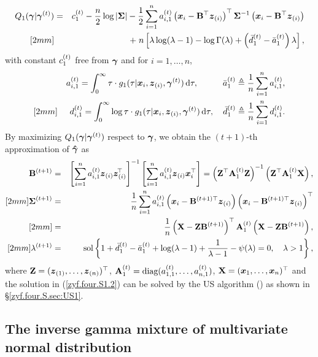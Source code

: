\begin{eqnarray*}
    Q_1({\boldsymbol{\gamma}} | {\boldsymbol{\gamma}}^{(t)}) &=& c^{(t)}_{1} - \frac{n}{2} \log|{\mbox{\boldmath$\Sigma$}}| - \frac{1}{2} \sum_{i=1}^n a^{(t)}_{i,1} \left({\boldsymbol{x}}_i - {\bf B}^\top {\boldsymbol{z}}_{(i)} \right)^\top {\mbox{\boldmath$\Sigma$}}^{-1} \left({\boldsymbol{x}}_i - {\bf B}^\top {\boldsymbol{z}}_{(i)} \right) \\ [2mm]
    && +\; n\left[\lambda\log(\lambda - 1) - \log\Gamma(\lambda) + \left(\bar{d}_{1}^{(t)}-\bar{a}_{1}^{(t)}\right)\lambda\right],
\end{eqnarray*}
with constant $c^{(t)}_{1}$ free from ${\boldsymbol{\gamma}}$ and for $i = 1, \dots, n$, 
\begin{eqnarray*}
    && a^{(t)}_{i,1} = \int_0^\infty \tau \cdot g_1(\tau | {\boldsymbol{x}}_i, {\boldsymbol{z}}_{(i)}, {\boldsymbol{\gamma}}^{(t)}) \,\mbox{d} \tau, \hspace{1cm} \bar{a}_{1}^{(t)} \triangleq \frac{1}{n} \sum_{i=1}^{n} a^{(t)}_{i,1}, \\ [2mm]
    && d^{(t)}_{i,1} = \int_0^\infty \log\tau \cdot g_1(\tau | {\boldsymbol{x}}_i, {\boldsymbol{z}}_{(i)}, {\boldsymbol{\gamma}}^{(t)}) \,\mbox{d} \tau, \quad \bar{d}_{1}^{(t)} \triangleq \frac{1}{n} \sum_{i=1}^{n} d^{(t)}_{i,1}.
\end{eqnarray*}
By maximizing $Q_1({\boldsymbol{\gamma}} | {\boldsymbol{\gamma}}^{(t)})$ respect to ${\boldsymbol{\gamma}}$, we obtain the $(t+1)$-th approximation of $\boldsymbol{\hat{\gamma}}$ as
\begin{eqnarray}
    {\bf B}^{(t+1)} &=& \left[ \sum_{i=1}^n a^{(t)}_{i,1} {\boldsymbol{z}}_{(i)} {\boldsymbol{z}}_{(i)}^{\!\top\!} \right]^{-1} \left[ \sum_{i=1}^n a^{(t)}_{i,1} {\boldsymbol{z}}_{(i)} {\boldsymbol{x}}_i^\top \right] = \left({\bf Z}^\top {\bf A}_{1}^{(t)} {\bf Z}\right)^{-1} \left({\bf Z}^\top {\bf A}_{1}^{(t)} {\bf X}\right), \nonumber \\ [2mm]
    {\mbox{\boldmath$\Sigma$}}^{(t+1)} &=& \frac{1}{n} \sum_{i=1}^n a^{(t)}_{i,1} \left( {\boldsymbol{x}}_i - {\bf B}^{(t+1)\top} {\boldsymbol{z}}_{(i)}\right) \left( {\boldsymbol{x}}_i - {\bf B}^{(t+1)\top}{\boldsymbol{z}}_{(i)} \right)^\top \nonumber \\ [2mm]
    &=& \frac{1}{n}\left({\bf X} - {\bf Z} {\bf B}^{(t+1)} \right)^\top {\bf A}_{1}^{(t)} \left({\bf X} - {\bf Z} {\bf B}^{(t+1)} \right), \nonumber \\ [2mm]
    \lambda^{(t+1)} &=& \mbox{sol}\left\{ 1 + \bar{d}_{1}^{(t)} - \bar{a}_{1}^{(t)} + \log(\lambda - 1) + \frac{1}{\lambda - 1}  - \psi(\lambda) = 0, \quad \lambda > 1 \right\}, \label{zyf.four.S1.2}
\end{eqnarray}
where ${\bf Z} = ({\boldsymbol{z}}_{(1)}, \dots, {\boldsymbol{z}}_{(n)})^\top$, ${\bf A}_{1}^{(t)} = \mbox{diag}(a^{(t)}_{1,1}, \dots, a^{(t)}_{n,1})$, ${\bf X} = ({\boldsymbol{x}}_1, \dots, {\boldsymbol{x}}_n)^\top$ and the solution in (\ref{zyf.four.S1.2}) can be solved by the US algorithm (\cite{LLZT2026}) as shown in \S\ref{zyf.four.S.sec:US1}.

\subsection{The inverse gamma mixture of multivariate normal distribution}       %

